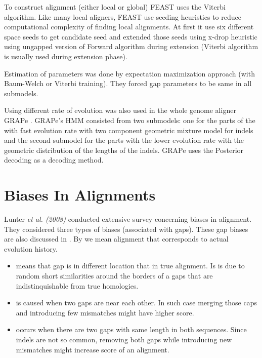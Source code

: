 To construct alignment (either local or global) FEAST uses the Viterbi
algorithm. Like many local aligners, FEAST use seeding heuristics to reduce
computational complexity of finding local alignments.  At first it use six
different space seeds to get candidate seed and extended those seeds using
x-drop heuristic \cite{Altschul1997} using ungapped version of Forward algorithm
during extension (Viterbi algorithm is usually used during extension phase).

Estimation of parameters was done by expectation maximization approach (with
Baum-Welch or Viterbi training). They forced gap parameters to be same in all
submodels.

Using different rate of evolution was also used  in the whole genome aligner
GRAPe \cite{Satija2010}. GRAPe's HMM  consisted from two submodels: one for the
parts of the with fast evolution rate with two component geometric mixture model
for indels and the second submodel for the parts with the lower evolution rate
with the geometric distribution of the lengths of the indels. GRAPe uses the
Posterior decoding as a decoding method.


\section{Biases In Alignments}

Lunter {\it et al. (2008)} conducted extensive survey concerning biases in
alignment. They considered three types of biases (associated with gaps). These
gap biases are also discussed in \cite{Durbin1998} . By
 we mean alignment that corresponds to actual 
evolution history.
\begin{itemize}

\item {} means that gap is in different location that in
true alignment. Is is due to random short similarities around the borders of
a gaps that are indistinquishable from true homologies.

\item {} is caused when two gaps are near each other.
In such case merging those caps and introducing few mismatches might have higher
score. 

\item {} occurs when there are two gaps with
same length in both sequences. Since indels are not so common, removing both
gaps while introducing new mismatches might increase score of an alignment.

\end{itemize}

